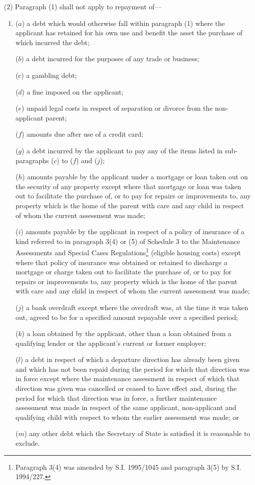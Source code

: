 \documentclass[a4paper]{article}
\begin{document}
(2) Paragraph (1) shall not apply to repayment of—
\begin{enumerate}\item[]
($a$) a debt which would otherwise fall within paragraph (1) where the applicant
has retained for his own use and benefit the asset the purchase of which
incurred the debt;

($b$) a debt incurred for the purposes of any trade or business;

($c$) a gambling debt;

($d$) a fine imposed on the applicant;

($e$) unpaid legal costs in respect of separation or divorce from the non-applicant
parent;

($f$) amounts due after use of a credit card;

($g$) a debt incurred by the applicant to pay any of the items listed in
sub-paragraphs ($c$) to ($f$) and ($j$);

($h$) amounts payable by the applicant under a mortgage or loan taken out on the
security of any property except where that mortgage or loan was taken out to
facilitate the purchase of, or to pay for repairs or improvements to, any
property which is the home of the parent with care and any child in respect of
whom the current assessment was made;

($i$) amounts payable by the applicant in respect of a policy of insurance of a
kind referred to in paragraph 3(4) or (5) of Schedule 3 to the Maintenance
Assessments and Special Cases Regulations\footnote{\frenchspacing Paragraph 3(4) was amended by S.I. 1995/1045 and paragraph 3(5) by S.I. 1994/227.} (eligible housing costs) except
where that policy of insurance was obtained or retained to discharge a mortgage
or charge taken out to facilitate the purchase of, or to pay for repairs or
improvements to, any property which is the home of the parent with care and any
child in respect of whom the current assessment was made;

($j$) a bank overdraft except where the overdraft was, at the time it was taken
out, agreed to be for a specified amount repayable over a specified period;

($k$) a loan obtained by the applicant, other than a loan obtained from a
qualifying lender or the applicant’s current or former employer;

($l$) a debt in respect of which a departure direction has already been given and
which has not been repaid during the period for which that direction was in
force except where the maintenance assessment in respect of which that direction
was given was cancelled or ceased to have effect and, during the period for
which that direction was in force, a further maintenance assessment was made in
respect of the same applicant, non-applicant and qualifying child with respect
to whom the earlier assessment was made; or

($m$) any other debt which the Secretary of State is satisfied it is reasonable to
exclude.
\end{enumerate}
\end{document}
